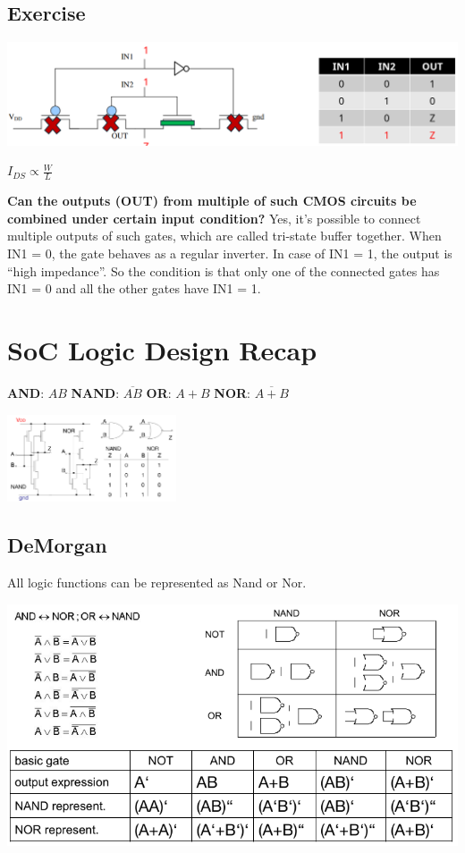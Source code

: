 \documentclass[english]{latex4ei/latex4ei_sheet}
\begin{document}
\subsection{Exercise}

\begin{center}
  \centering
  \includegraphics[width=\linewidth]{assets/CMOSOperation.png}
  \label{fig:cmosoperation}
\end{center}

$I_{DS} \varpropto \frac{W}{L}$

\textbf{Can the outputs (OUT) from multiple of such CMOS circuits be combined under certain input condition?}
Yes, it’s possible to connect multiple outputs of such gates, which are called tri-state buffer together. When IN1 = 0, the gate behaves as a regular inverter. In case of IN1 = 1, the output is “high impedance”. So the condition is that only one of the connected gates has IN1 = 0 and all the other gates have IN1 = 1.


\section{SoC Logic Design Recap}
\textbf{AND}: $A B$
\textbf{NAND}: $\overline{A B}$
\textbf{OR}: $A + B$
\textbf{NOR}: $\overline{A + B}$
\begin{center}
	\includegraphics[width = 5cm ]{images/2. SoC Logic Design Recap/NandNor.png}
\end{center}

\subsection{DeMorgan}

All logic functions can be represented as Nand or Nor.
\begin{center}
	\includegraphics[width = \linewidth]{images/2. SoC Logic Design Recap/DeMorgan.png}
\end{center}
\end{document}
